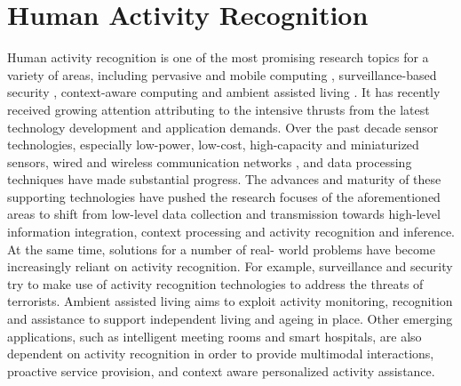 \section{Human Activity Recognition}
\label{sec:soa:har}


Human activity recognition is one of the most promising research topics for a variety of areas, including pervasive and mobile computing \cite{Weiser1991} \cite{Choudhury2008}, surveillance-based security \cite{Poppe2010} \cite{Akdemir2008} \cite{Weinland2011}, context-aware computing \cite{Laerhoven2001} \cite{Wren2006} and ambient assisted living \cite{Philipose2004} \cite{Cook2009} \cite{Kasteren2008} \cite{Chen2012a}. It has recently received growing attention attributing to the intensive thrusts from the latest technology development and application demands. Over the past decade sensor technologies, especially low-power, low-cost, high-capacity and miniaturized sensors, wired and wireless communication networks \cite{Pantelopoulos2010} \cite{Alemdar2010} \cite{Ding2011}, and data processing techniques have made substantial progress. The advances and maturity of these supporting technologies have pushed the research focuses of the aforementioned areas to shift from low-level data collection and transmission towards high-level information integration, context processing and activity recognition and inference. At the same time, solutions for a number of real- world problems have become increasingly reliant on activity recognition. For example, surveillance and security try to make use of activity recognition technologies to address the threats of terrorists. Ambient assisted living aims to exploit activity monitoring, recognition and assistance to support independent living and ageing in place. Other emerging applications, such as intelligent meeting rooms and smart hospitals, are also dependent on activity recognition in order to provide multimodal interactions, proactive service provision, and context aware personalized activity assistance. 

